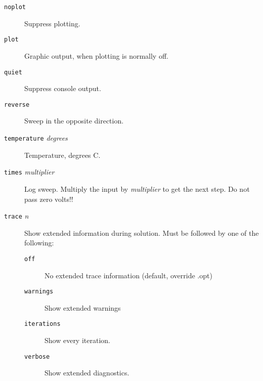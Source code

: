 \begin{description}


\item[{\tt noplot}]
Suppress plotting.

\item[{\tt plot}]
Graphic output, when plotting is normally off.

\item[{\tt quiet}]
Suppress console output.


\item[{\tt reverse}]
Sweep in the opposite direction.


\item[{\tt temperature} {\it degrees}]
Temperature, degrees C.

\item[{\tt times} {\it multiplier}]
Log sweep.  Multiply the input by {\it multiplier} to get the next
step.  Do not pass zero volts!!

\item[{\tt trace} {\it n}]
Show extended information during solution.
Must be followed by one of the following:
\begin{description}
\item[{\tt off}] No extended trace information (default, override .opt)
\item[{\tt warnings}] Show extended warnings
\item[{\tt iterations}] Show every iteration.
\item[{\tt verbose}] Show extended diagnostics.
\end{description}


\end{description}
